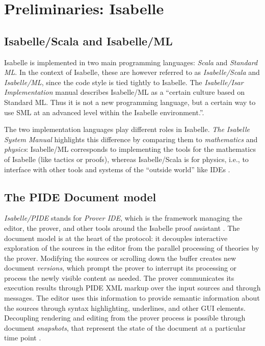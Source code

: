\chapter{Preliminaries: Isabelle}\label{chapter:preliminaries}
\section{Isabelle/Scala and Isabelle/ML}
Isabelle is implemented in two main programming languages: \textit{Scala} and 
\textit{Standard ML}.
In the context of Isabelle, these are however referred to as 
\textit{Isabelle/Scala} and \textit{Isabelle/ML}, since the code style is
tied tightly to Isabelle. The 
\textit{Isabelle/Isar Implementation} manual describes Isabelle/ML as a 
``certain
culture based on Standard ML. Thus it is not a new programming language, but a
certain way to use SML at an advanced level within the Isabelle environment.''\cite{isabelle-implementation}.

The two implementation languages play different roles in Isabelle.
\textit{The Isabelle System Manual} highlights this difference by 
comparing them to \textit{mathematics} and \textit{physics}:
Isabelle/ML corresponds to implementing the tools for the mathematics of 
Isabelle (like tactics or proofs), whereas Isabelle/Scala is for
physics, i.e., to interface with other tools and systems of the
``outside world'' like IDEs \cite{isabelle-system}.

\section{The PIDE Document model}
\textit{Isabelle/PIDE} stands for \textit{Prover IDE}, which is the framework
managing the editor, the prover, and other tools around the Isabelle
proof assistant \cite{wenzel2019interaction,isabelle-pide}. The document model is at the 
heart of the protocol: it decouples interactive exploration of the sources in the editor 
from the parallel processing of theories by the prover. Modifying the sources or scrolling
down the buffer creates new document \textit{versions}, which prompt the prover to
interrupt its processing or process the newly visible content as needed. The prover 
communicates its execution results through PIDE
XML markup over the input sources and through messages. 
The editor uses this information to provide semantic information about the sources through
syntax highlighting, underlines, and other GUI elements.
Decoupling rendering and editing from
the prover process is possible through document \textit{snapshots}, that represent
the state of the document at a particular time point \cite{wenzel2019interaction}.


